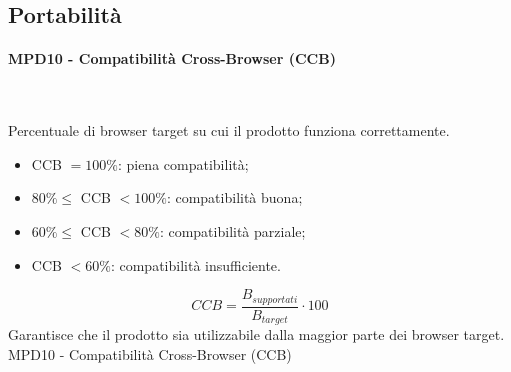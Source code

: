 \documentclass[10pt, letterpaper]{article}
\newcommand{\trisubsection}[1]{\paragraph{#1}\mbox{}\\}
\begin{document}
\subsection{Portabilità}
\trisubsection{MPD10 - Compatibilità Cross-Browser (CCB)}
{Percentuale di browser target su cui il prodotto funziona correttamente.
    \begin{itemize}
        \item CCB $= 100\%$: piena compatibilità;
        \item $80\% \leq$ CCB $< 100\%$: compatibilità buona;
        \item $60\% \leq$ CCB $< 80\%$: compatibilità parziale;
        \item CCB $< 60\%$: compatibilità insufficiente.
    \end{itemize}}
{\[ CCB = \frac{B_{supportati}}{B_{target}} \cdot 100 \]}
{Garantisce che il prodotto sia utilizzabile dalla maggior parte dei browser target.}
{MPD10 - Compatibilità Cross-Browser (CCB)}
\end{document}
